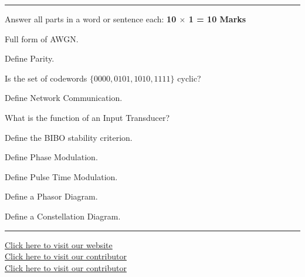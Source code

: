 \documentclass[11pt,a4paper]{article}
\begin{document}
\bigskip


\rule{\linewidth}{0.4pt}\smallskip

Answer all parts in a word or sentence each: \hfill   \textbf{10 $ \times$ 1 = 10 Marks}

\begin{parts}
  \item Full form of AWGN.
  \item Define Parity.
  \item Is the set of codewords $\{0000, 0101, 1010, 1111\}$ cyclic?
  \item Define Network Communication.
  \item What is the function of an Input Transducer?
  \item Define the BIBO stability criterion.
  \item Define Phase Modulation.
  \item Define Pulse Time Modulation.
  \item Define a Phasor Diagram.
  \item Define a Constellation Diagram.
\end{parts}

\vfill
\rule{\linewidth}{0.4pt}

\begin{center}\small
\href{https://bhu-exam.vercel.app/}{Click here to visit our website}\\[4pt]\href{https://me-aryan.vercel.app/}{Click here to visit our contributor}\\[4pt]\href{https://quashan-me.vercel.app/}{Click here to visit our contributor}
\end{center}
\end{document}
